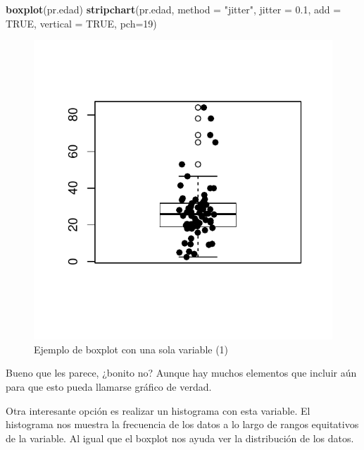 \documentclass[]{article}
\newenvironment{Shaded}{\begin{snugshade}}{\end{snugshade}}
\newcommand{\KeywordTok}[1]{\textcolor[rgb]{0.13,0.29,0.53}{\textbf{{#1}}}}
\newcommand{\DataTypeTok}[1]{\textcolor[rgb]{0.13,0.29,0.53}{{#1}}}
\newcommand{\DecValTok}[1]{\textcolor[rgb]{0.00,0.00,0.81}{{#1}}}
\newcommand{\FloatTok}[1]{\textcolor[rgb]{0.00,0.00,0.81}{{#1}}}
\newcommand{\StringTok}[1]{\textcolor[rgb]{0.31,0.60,0.02}{{#1}}}
\newcommand{\OtherTok}[1]{\textcolor[rgb]{0.56,0.35,0.01}{{#1}}}
\newcommand{\NormalTok}[1]{{#1}}
\begin{document}
\begin{Shaded}
\begin{Highlighting}[]
\KeywordTok{boxplot}\NormalTok{(pr.edad)}
\KeywordTok{stripchart}\NormalTok{(pr.edad, }\DataTypeTok{method =} \StringTok{"jitter"}\NormalTok{, }\DataTypeTok{jitter =} \FloatTok{0.1}\NormalTok{, }\DataTypeTok{add =}
\OtherTok{TRUE}\NormalTok{, }\DataTypeTok{vertical =} \OtherTok{TRUE}\NormalTok{, }\DataTypeTok{pch=}\DecValTok{19}\NormalTok{)}
\end{Highlighting}
\end{Shaded}

\begin{figure}

{\centering \includegraphics{index_files/figure-latex/unnamed-chunk-16-1} 

}

\caption{Ejemplo de boxplot con una sola variable (1)}\label{fig:unnamed-chunk-16}
\end{figure}

Bueno que les parece, ¿bonito no? Aunque hay muchos elementos que
incluir aún para que esto pueda llamarse gráfico de verdad.

Otra interesante opción es realizar un histograma con esta variable. El
histograma nos muestra la frecuencia de los datos a lo largo de rangos
equitativos de la variable. Al igual que el boxplot nos ayuda ver la
distribución de los datos.
\end{document}
